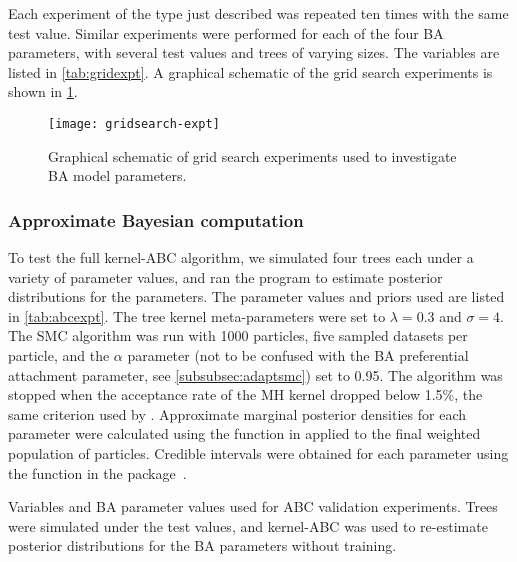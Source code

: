Each experiment of the type just described was repeated ten times with the same
test value. Similar experiments were performed for each of the four \gls{BA}
parameters, with several test values and trees of varying sizes. The variables
are listed in \cref{tab:gridexpt}. A graphical schematic of the grid search
experiments is shown in \cref{fig:gridexpt}.

\begin{figure}[ht]
  \centering
  \texttt{[image: gridsearch-expt]}
  \caption{Graphical schematic of grid search experiments used to investigate 
    \gls{BA} model parameters.}
  \label{fig:gridexpt}
\end{figure}

\subsubsection*{Approximate Bayesian computation}

To test the full kernel-\gls{ABC} algorithm, we simulated four trees each under
a variety of parameter values, and ran the  program to
estimate posterior distributions for the parameters. The parameter values and
priors used are listed in \ref{tab:abcexpt}. The tree kernel meta-parameters
were set to $\lambda = 0.3$ and $\sigma = 4$. The \gls{SMC} algorithm was run
with 1000 particles, five sampled datasets per particle, and the $\alpha$
parameter (not to be confused with the \gls{BA} preferential attachment
parameter, see \cref{subsubsec:adaptsmc}) set to 0.95. The algorithm was
stopped when the acceptance rate of the \gls{MH} kernel dropped below 1.5\%,
the same criterion used by \citeauthor{del2012adaptive}. Approximate marginal
posterior densities for each parameter were calculated using the
 function in  applied to the final weighted
population of particles. Credible intervals were obtained for each parameter
using the  function in the 
package~\autocite{plummer2006coda}.

\begin{table}[ht]
  \centering
  
  \caption[Variables used in grid search experiments]
  {
    Variables and \gls{BA} parameter values used for \gls{ABC} validation
    experiments. Trees were simulated under the test values, and
    kernel-\gls{ABC} was used to re-estimate posterior distributions for the
    \gls{BA} parameters without training.
  }
  \label{tab:abcexpt}
\end{table}

